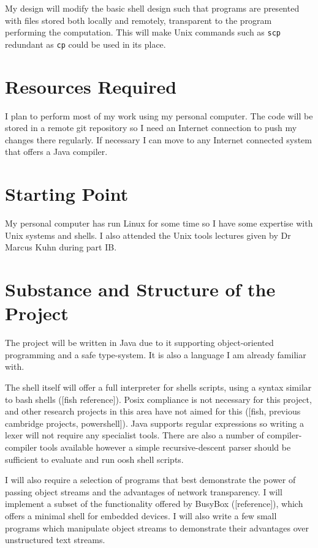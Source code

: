 \documentclass[12pt]{article}
\begin{document}
My design will modify the basic shell design such that programs are
presented with files stored both locally and remotely, transparent to
the program performing the computation. This will make Unix commands
such as \texttt{scp} redundant as \texttt{cp} could be used in its
place.

\section*{Resources Required}
I plan to perform most of my work using my personal computer. The code
will be stored in a remote git repository so I need an Internet
connection to push my changes there regularly. If necessary I can move
to any Internet connected system that offers a Java compiler.

\section*{Starting Point}
My personal computer has run Linux for some time so I have some
expertise with Unix systems and shells. I also attended the Unix tools
lectures given by Dr Marcus Kuhn during part IB.

\section*{Substance and Structure of the Project}
The project will be written in Java due to it supporting
object-oriented programming and a safe type-system. It is also a
language I am already familiar with.

The shell itself will offer a full interpreter for shells scripts,
using a syntax similar to bash shells ([fish reference]). Posix
compliance is not necessary for this project, and other research
projects in this area have not aimed for this ([fish, previous
cambridge projects, powershell]). Java supports regular expressions so
writing a lexer will not require any specialist tools. There are also
a number of compiler-compiler tools available however a simple
recursive-descent parser should be sufficient to evaluate and run
oosh shell scripts.

I will also require a selection of programs that best demonstrate the
power of passing object streams and the advantages of network
transparency. I will implement a subset of the functionality offered
by BusyBox ([reference]), which offers a minimal shell for embedded
devices. I will also write a few small programs which manipulate
object streams to demonstrate their advantages over unstructured text streams.
\end{document}
